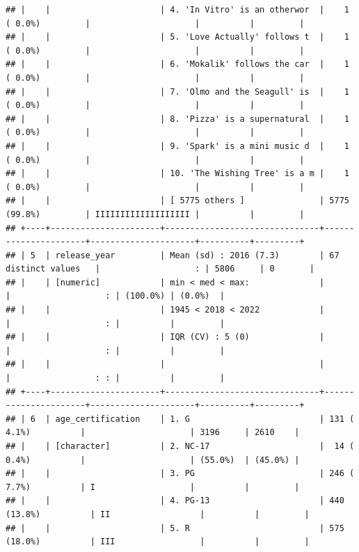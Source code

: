 \documentclass[11pt,preprint]{elsarticle}
\numberwithin{equation}{section}
\numberwithin{figure}{section}
\numberwithin{table}{section}
\begin{document}
\begin{verbatim}
## |    |                      | 4. 'In Vitro' is an otherwor  |    1 ( 0.0%)         |                     |          |         |
## |    |                      | 5. 'Love Actually' follows t  |    1 ( 0.0%)         |                     |          |         |
## |    |                      | 6. 'Mokalik' follows the car  |    1 ( 0.0%)         |                     |          |         |
## |    |                      | 7. 'Olmo and the Seagull' is  |    1 ( 0.0%)         |                     |          |         |
## |    |                      | 8. 'Pizza' is a supernatural  |    1 ( 0.0%)         |                     |          |         |
## |    |                      | 9. 'Spark' is a mini music d  |    1 ( 0.0%)         |                     |          |         |
## |    |                      | 10. 'The Wishing Tree' is a m |    1 ( 0.0%)         |                     |          |         |
## |    |                      | [ 5775 others ]               | 5775 (99.8%)         | IIIIIIIIIIIIIIIIIII |          |         |
## +----+----------------------+-------------------------------+----------------------+---------------------+----------+---------+
## | 5  | release_year         | Mean (sd) : 2016 (7.3)        | 67 distinct values   |                   : | 5806     | 0       |
## |    | [numeric]            | min < med < max:              |                      |                   : | (100.0%) | (0.0%)  |
## |    |                      | 1945 < 2018 < 2022            |                      |                   : |          |         |
## |    |                      | IQR (CV) : 5 (0)              |                      |                   : |          |         |
## |    |                      |                               |                      |                 : : |          |         |
## +----+----------------------+-------------------------------+----------------------+---------------------+----------+---------+
## | 6  | age_certification    | 1. G                          | 131 ( 4.1%)          |                     | 3196     | 2610    |
## |    | [character]          | 2. NC-17                      |  14 ( 0.4%)          |                     | (55.0%)  | (45.0%) |
## |    |                      | 3. PG                         | 246 ( 7.7%)          | I                   |          |         |
## |    |                      | 4. PG-13                      | 440 (13.8%)          | II                  |          |         |
## |    |                      | 5. R                          | 575 (18.0%)          | III                 |          |         |

\end{verbatim}
\end{document}
